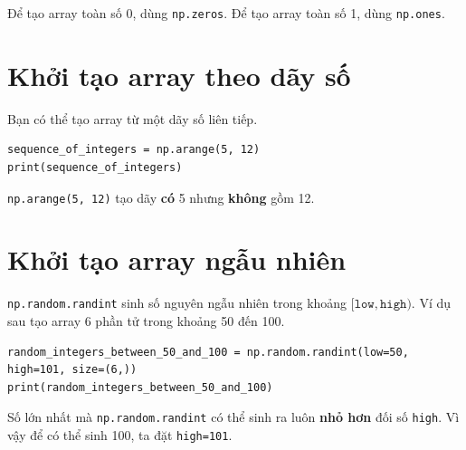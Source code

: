 \documentclass[12pt,a4paper]{article}
\begin{document}
\begin{luuy}[title={Array toàn số 0 và toàn số 1}]
Để tạo array toàn số 0, dùng \texttt{np.zeros}. Để tạo array toàn số 1, dùng \texttt{np.ones}.
\end{luuy}

\section{Khởi tạo array theo dãy số}

\begin{phuongphap}[title={Tạo dãy số bằng \texttt{np.arange}}]
Bạn có thể tạo array từ một dãy số liên tiếp.
\end{phuongphap}

\begin{lstlisting}
sequence_of_integers = np.arange(5, 12)
print(sequence_of_integers)
\end{lstlisting}

\begin{luuy}[title={Cận dưới và cận trên trong \texttt{np.arange}}]
\texttt{np.arange(5, 12)} tạo dãy \textbf{có} 5 nhưng \textbf{không} gồm 12.
\end{luuy}

\section{Khởi tạo array ngẫu nhiên}

\begin{phuongphap}[title={Số nguyên ngẫu nhiên bằng \texttt{np.random.randint}}]
\texttt{np.random.randint} sinh số nguyên ngẫu nhiên trong khoảng \([\texttt{low}, \texttt{high})\).
Ví dụ sau tạo array 6 phần tử trong khoảng 50 đến 100.
\end{phuongphap}

\begin{lstlisting}
random_integers_between_50_and_100 = np.random.randint(low=50, high=101, size=(6,))
print(random_integers_between_50_and_100)
\end{lstlisting}

\begin{luuy}[title={Giá trị lớn nhất sinh ra}]
Số lớn nhất mà \texttt{np.random.randint} có thể sinh ra luôn \textbf{nhỏ hơn} đối số \texttt{high}.
Vì vậy để có thể sinh 100, ta đặt \texttt{high=101}.
\end{luuy}
\end{document}

